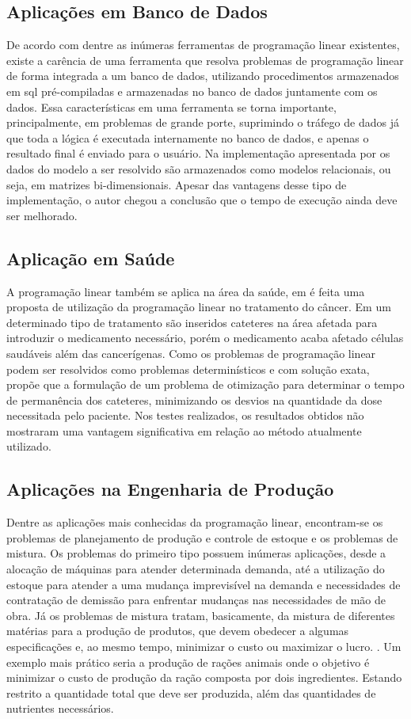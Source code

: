 \subsection{Aplicações em Banco de Dados}
De acordo com  dentre as inúmeras ferramentas de programação linear existentes, existe a carência de uma ferramenta que resolva problemas de programação linear de forma integrada a um banco de dados, utilizando procedimentos armazenados em sql pré-compiladas e armazenadas no banco de dados juntamente com os dados. Essa características em uma ferramenta se torna importante, principalmente, em problemas de grande porte, suprimindo o tráfego de dados já que toda a lógica é executada internamente no banco de dados, e apenas o resultado final é enviado para o usuário. Na implementação apresentada por  os dados do modelo a ser resolvido são armazenados como modelos relacionais, ou seja, em matrizes bi-dimensionais. Apesar das vantagens desse tipo de implementação, o autor chegou a conclusão que o tempo de execução ainda deve ser melhorado.

\subsection{Aplicação em Saúde}
A programação linear também se aplica na área da saúde, em  é feita uma proposta de utilização da programação linear no tratamento do câncer. 
Em um determinado tipo de tratamento são inseridos cateteres na área afetada para introduzir o medicamento necessário, porém o medicamento acaba afetado células saudáveis além das cancerígenas. Como os problemas de programação linear podem ser resolvidos como problemas determinísticos e com solução exata,  propõe que a formulação de um problema de otimização para determinar o tempo de permanência dos cateteres, minimizando os desvios na quantidade da dose necessitada pelo paciente. Nos testes realizados, os resultados obtidos não mostraram uma vantagem significativa em relação ao método atualmente utilizado.

\subsection{Aplicações na Engenharia de Produção}
Dentre as aplicações mais conhecidas da programação linear, encontram-se os problemas de planejamento de produção e controle de estoque e os problemas de mistura. Os problemas do primeiro tipo possuem inúmeras aplicações, desde a alocação de máquinas para atender determinada demanda, até a utilização do estoque para atender a uma mudança imprevisível na demanda e necessidades de contratação de demissão para enfrentar mudanças nas necessidades de mão de obra. Já os problemas de mistura tratam, basicamente, da mistura de diferentes matérias para a produção de produtos, que devem obedecer a algumas especificações e, ao mesmo tempo, minimizar o custo ou maximizar o lucro.  \cite{Taha}.
Um exemplo mais prático seria a produção de rações animais onde o objetivo é minimizar o custo de produção da ração composta por dois ingredientes. Estando restrito a quantidade total que deve ser produzida, além das quantidades de nutrientes necessários.

